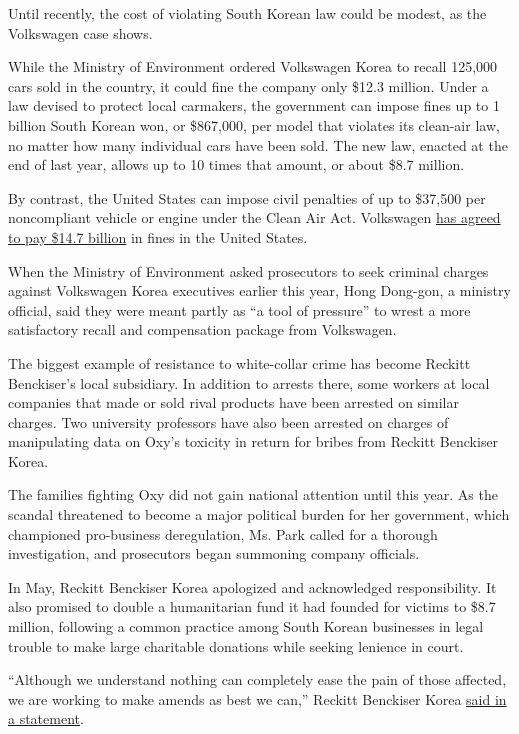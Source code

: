 Until recently, the cost of violating South Korean law could be modest,
as the Volkswagen case shows.

While the Ministry of Environment ordered Volkswagen Korea to recall
125,000 cars sold in the country, it could fine the company only \$12.3
million. Under a law devised to protect local carmakers, the government
can impose fines up to 1 billion South Korean won, or \$867,000, per
model that violates its clean-air law, no matter how many individual
cars have been sold. The new law, enacted at the end of last year,
allows up to 10 times that amount, or about \$8.7 million.

By contrast, the United States can impose civil penalties of up to
\$37,500 per noncompliant vehicle or engine under the Clean Air Act.
Volkswagen
\href{http://www.nytimes.com/2016/06/28/business/volkswagen-settlement-diesel-scandal.html}{has
agreed to pay \$14.7 billion} in fines in the United States.

When the Ministry of Environment asked prosecutors to seek criminal
charges against Volkswagen Korea executives earlier this year, Hong
Dong-gon, a ministry official, said they were meant partly as ``a tool
of pressure'' to wrest a more satisfactory recall and compensation
package from Volkswagen.

The biggest example of resistance to white-collar crime has become
Reckitt Benckiser's local subsidiary. In addition to arrests there, some
workers at local companies that made or sold rival products have been
arrested on similar charges. Two university professors have also been
arrested on charges of manipulating data on Oxy's toxicity in return for
bribes from Reckitt Benckiser Korea.

The families fighting Oxy did not gain national attention until this
year. As the scandal threatened to become a major political burden for
her government, which championed pro-business deregulation, Ms. Park
called for a thorough investigation, and prosecutors began summoning
company officials.

In May, Reckitt Benckiser Korea apologized and acknowledged
responsibility. It also promised to double a humanitarian fund it had
founded for victims to \$8.7 million, following a common practice among
South Korean businesses in legal trouble to make large charitable
donations while seeking lenience in court.

``Although we understand nothing can completely ease the pain of those
affected, we are working to make amends as best we can,'' Reckitt
Benckiser Korea
\href{http://www.rb.com/media/news/2016/may/oxy-rb-and-humidifier-sterilizers-in-korea/}{said
in a statement}.

